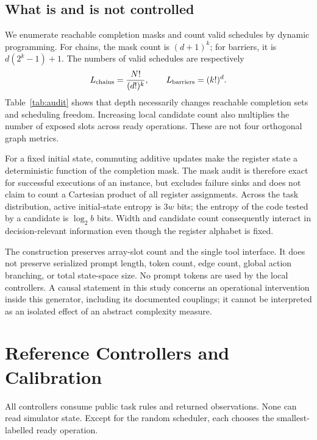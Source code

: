 \documentclass[sigconf,nonacm]{acmart}
\begin{document}
\begin{table}[t]
\centering
\small
\resizebox{\columnwidth}{!}{}
\caption{Exact structural audit at $N=8$. ``Masks'' counts reachable sets
of completed operations; ``orders'' counts successful operation
permutations. Ready nodes are averaged uniformly over nonterminal reachable
completion masks, not over a controller's trajectories.}
\label{tab:audit}
\end{table}

\subsection{What is and is not controlled}
We enumerate reachable completion masks and count valid schedules by
dynamic programming. For chains, the mask count is $(d+1)^k$; for barriers,
it is $d(2^k-1)+1$. The numbers of valid schedules are respectively
\[
 L_{\rm chains}=\frac{N!}{(d!)^k},
 \qquad L_{\rm barriers}=(k!)^d.
\]
Table~\ref{tab:audit} shows that depth necessarily changes reachable
completion sets and scheduling freedom. Increasing local candidate count
also multiplies the number of exposed slots across ready operations.
These are not four orthogonal graph metrics.

For a fixed initial state, commuting additive updates make the register
state a deterministic function of the completion mask. The mask audit is
therefore exact for successful executions of an instance, but excludes
failure sinks and does not claim to count a Cartesian product of all
register assignments. Across the task distribution, active initial-state
entropy is $3w$ bits; the entropy of the code tested by a candidate is
$\log_2 b$ bits. Width and candidate count consequently interact in
decision-relevant information even though the register alphabet is fixed.

The construction preserves array-slot count and the single tool interface.
It does not preserve serialized prompt length, token count, edge count,
global action branching, or total state-space size. No prompt tokens are
used by the local controllers. A causal statement in this study concerns
an operational intervention inside this generator, including its documented
couplings; it cannot be interpreted as an isolated effect of an abstract
complexity measure.

\section{Reference Controllers and Calibration}
All controllers consume public task rules and returned observations.
None can read simulator state. Except for the random scheduler, each chooses
the smallest-labelled ready operation.
\end{document}
